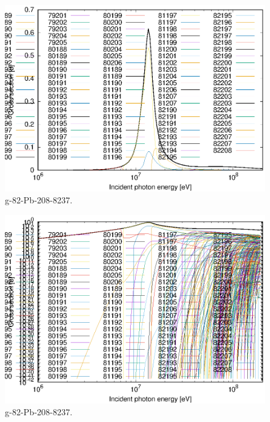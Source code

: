 \begin{figure}
 \includegraphics[width=\linewidth]{eps/g_82-Pb-208_8237.eps}
  \caption{g-82-Pb-208-8237.}
\end{figure}
\begin{figure}
 \includegraphics[width=\linewidth]{eps-log/g_82-Pb-208_8237.eps}
 \caption{g-82-Pb-208-8237.}
\end{figure}
\newpage \clearpage

